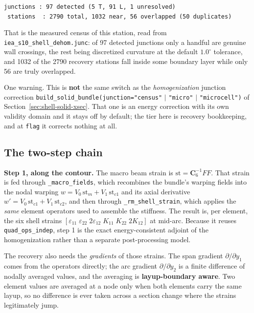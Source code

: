 \begin{Verbatim}[frame=single,framesep=4pt,fontsize=\small]
 junctions : 97 detected (5 T, 91 L, 1 unresolved)
 stations  : 2790 total, 1032 near, 56 overlapped (50 duplicates)
\end{Verbatim}

That is the measured census of this station, read from
\texttt{iea\_s10\_shell\_dehom.junc}: of 97 detected junctions only a handful
are genuine wall crossings, the rest being discretized curvature at the default
$1.0^\circ$ tolerance, and 1032 of the 2790 recovery stations fall inside some
boundary layer while only 56 are truly overlapped.

One warning. This is \textbf{not} the same switch as the \emph{homogenization}
junction correction \texttt{build\_solid\_bundle(junction="census"} $|$
\texttt{"micro"} $|$ \texttt{"microcell")} of
Section~\ref{sec:shell-solid-xsec}. That one is an energy correction with its
own validity domain and it stays off by default; the tier here is recovery
bookkeeping, and at \texttt{flag} it corrects nothing at all.

\subsection{The two-step chain}

\textbf{Step 1, along the contour.} The macro beam strain is
$\mathrm{st} = \mathbf{C}_6^{-1}FF$. That strain is fed through
\texttt{\_macro\_fields}, which recombines the bundle's warping fields into the
nodal warping $w = V_0\,\mathrm{st}_m + V_1\,\mathrm{st}_{c1}$ and its axial
derivative $w' = V_0\,\mathrm{st}_{c1} + V_1\,\mathrm{st}_{c2}$, and then through
\texttt{\_rm\_shell\_strain}, which applies the \emph{same} element operators
used to assemble the stiffness. The result is, per element, the six shell strains
$[\varepsilon_{11}\;\varepsilon_{22}\;2\varepsilon_{12}\;K_{11}\;K_{22}\;2K_{12}]$
at mid-arc. Because it reuses \texttt{quad\_ops\_indep}, step 1 is the exact
energy-consistent adjoint of the homogenization rather than a separate
post-processing model.

The recovery also needs the \emph{gradients} of those strains. The span gradient
$\partial/\partial y_1$ comes from the operators directly; the arc gradient
$\partial/\partial y_2$ is a finite difference of nodally averaged values, and
the averaging is \textbf{layup-boundary aware}. Two element values are averaged
at a node only when both elements carry the same layup, so no difference is ever
taken across a section change where the strains legitimately jump.

